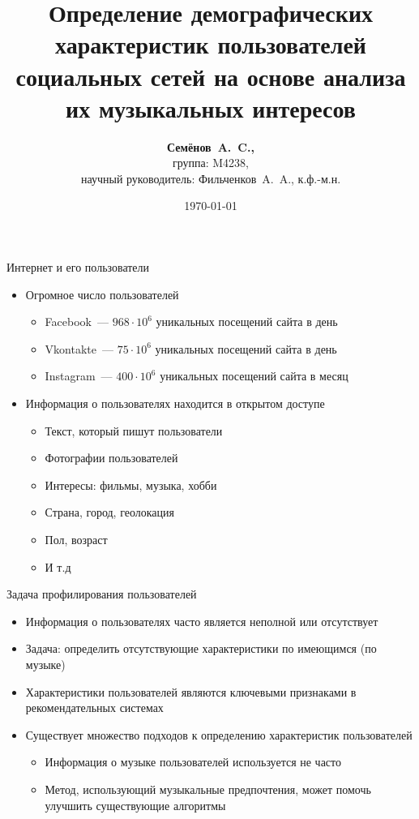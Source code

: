 \documentclass{beamer}
\title{Определение демографических характеристик пользователей
социальных сетей на основе анализа их музыкальных интересов}
\author{\textbf{Семёнов~A.~C.,} \\ 
    группа: M4238, \\
    научный руководитель: Фильченков~A.~A., к.ф.-м.н.}
\institute{Университет ИТМО}
\date{\today}
\begin{document}
\begin{frame}
  \titlepage
\end{frame}

\begin{frame}{Интернет и его пользователи}
  \begin{itemize}
      \item {Огромное число пользователей}
          \begin{itemize}
              \item {Facebook~--- $968 \cdot 10^{6}$ уникальных посещений сайта в день}
              \item {Vkontakte~--- $75 \cdot 10^{6}$ уникальных посещений сайта в день}
              \item {Instagram~--- $400 \cdot 10^{6}$ уникальных посещений сайта в месяц}
          \end{itemize}
      \item {Информация о пользователях находится в открытом доступе}
          \begin{itemize}
              \item {Текст, который пишут пользователи}
              \item {Фотографии пользователей}
              \item {Интересы: фильмы, музыка, хобби}
              \item {Страна, город, геолокация}
              \item {Пол, возраст}
              \item {И т.д}
          \end{itemize}
  \end{itemize}
\end{frame}

\begin{frame}{Задача профилирования пользователей}
  \begin{itemize}
      \item {Информация о пользователях часто является неполной или отсутствует}
      \item {Задача: определить отсутствующие характеристики по имеющимся (по музыке)}
      \item {Характеристики пользователей являются ключевыми признаками в рекомендательных системах}
      \item {Существует множество подходов к определению характеристик пользователей}
          \begin{itemize}
              \item {Информация о музыке пользователей используется не часто}
              \item {Метод, использующий музыкальные предпочтения, может помочь улучшить существующие алгоритмы}
          \end{itemize}
  \end{itemize}
\end{frame}
\end{document}
